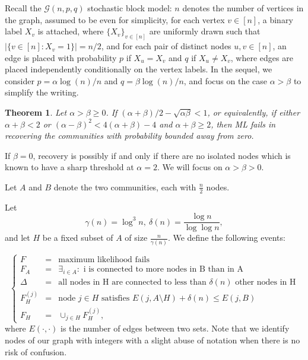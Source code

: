 \documentclass[english]{article}
\newtheorem{theorem}{Theorem}
\newcommand{\1}{\textbf{1}}
\begin{document}
Recall the $\mathcal{G}(n,p,q)$ stochastic block model: $n$ denotes the number of vertices in the graph, assumed to be even for simplicity, for each vertex $v \in [n]$, a binary label $X_v$ is attached, where $\{X_v\}_{v \in [n]}$ are uniformly drawn such that $|\{v \in [n] : X_v =1\}|=n/2$, and for each pair of distinct nodes $u,v \in [n]$, an edge is placed with probability $p$ if $X_u=X_v$ and $q$ if $X_u \neq X_v$, where edges are placed independently conditionally on the vertex labels. In the sequel, we consider $p=\alpha \log(n)/n$ and $q=\beta \log(n)/n$, and focus on the case $\alpha > \beta$ to simplify the writing. 


\begin{theorem}\label{theorem:mainlowerbound}
Let $\alpha>\beta \geq 0$. If $(\alpha + \beta)/2 - \sqrt{\alpha \beta} < 1$, or equivalently, if either $\alpha + \beta < 2$ or $(\alpha-\beta)^2 < 4(\alpha+\beta) - 4$ and $\alpha + \beta \geq 2$, then ML fails in recovering the communities with probability bounded away from zero.
\end{theorem}

If $\beta = 0$, recovery is possibly if and only if there are no isolated nodes which is known to have a sharp threshold at $\alpha=2$. We will focus on $\alpha>\beta>0$.

Let $A$ and $B$ denote the two communities, each with $\frac{n}2$ nodes. 

Let
$$\gamma(n) = \log^3 n, \ \delta(n) = \frac{\log n}{\log \log n},$$
and let $H$ be a fixed subset of $A$ of size $\frac{n}{\gamma(n)}$.
We define the following events:

\begin{equation}\label{def:events}
\left\{
\begin{array}{ccl}
F & = & \text{maximum likelihood fails} \\
F_A & = & \exists_{i\in A} : \text{ i is connected to more nodes in B than in A} \\
\Delta & = & \text{all nodes in H are connected to less than }\delta(n) \text{ other nodes in H} \\
F_H^{(j)} & = & \text{node }j\in H \text{ satisfies } E(j,A\setminus H) +\delta(n) \leq E(j,B) \\
F_H & = & \cup_{j\in H} F_H^{(j)},
\end{array}
\right.
\end{equation}
where $E(\cdot,\cdot)$ is the number of edges between two sets. Note that we identify nodes of our graph with integers with a slight abuse of notation when there is no risk of confusion.
\end{document}
